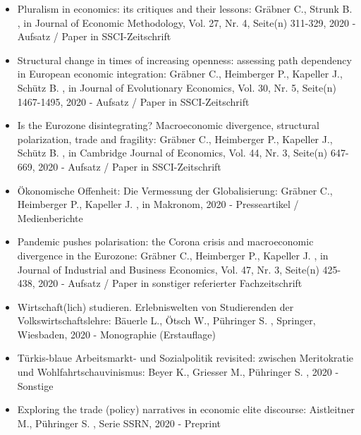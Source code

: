 \begin{itemize}
	 \item Pluralism in economics: its critiques and their lessons: Gräbner C., Strunk B. , in Journal of Economic Methodology, Vol. 27, Nr. 4, Seite(n) 311-329, 2020 - Aufsatz / Paper in SSCI-Zeitschrift
	 \item Structural change in times of increasing openness: assessing path dependency in European economic integration: Gräbner C., Heimberger P., Kapeller J., Schütz B. , in Journal of Evolutionary Economics, Vol. 30, Nr. 5, Seite(n) 1467-1495, 2020 - Aufsatz / Paper in SSCI-Zeitschrift
	 \item Is the Eurozone disintegrating? Macroeconomic divergence, structural polarization, trade and fragility: Gräbner C., Heimberger P., Kapeller J., Schütz B. , in Cambridge Journal of Economics, Vol. 44, Nr. 3, Seite(n) 647-669, 2020 - Aufsatz / Paper in SSCI-Zeitschrift
	 \item Ökonomische Offenheit: Die Vermessung der Globalisierung: Gräbner C., Heimberger P., Kapeller J. , in Makronom, 2020 - Presseartikel / Medienberichte
	 \item Pandemic pushes polarisation: the Corona crisis and macroeconomic divergence in the Eurozone: Gräbner C., Heimberger P., Kapeller J. , in Journal of Industrial and Business Economics, Vol. 47, Nr. 3, Seite(n) 425-438, 2020 - Aufsatz / Paper in sonstiger referierter Fachzeitschrift
	 \item Wirtschaft(lich) studieren. Erlebniswelten von Studierenden der Volkswirtschaftslehre: Bäuerle L., Ötsch W., Pühringer S. , Springer, Wiesbaden, 2020 - Monographie (Erstauflage)
	 \item Türkis-blaue Arbeitsmarkt- und Sozialpolitik revisited: zwischen Meritokratie und Wohlfahrtschauvinismus: Beyer K., Griesser M., Pühringer S. , 2020 - Sonstige
	 \item Exploring the trade (policy) narratives in economic elite discourse: Aistleitner M., Pühringer S. , Serie SSRN, 2020 - Preprint
\end{itemize} 
